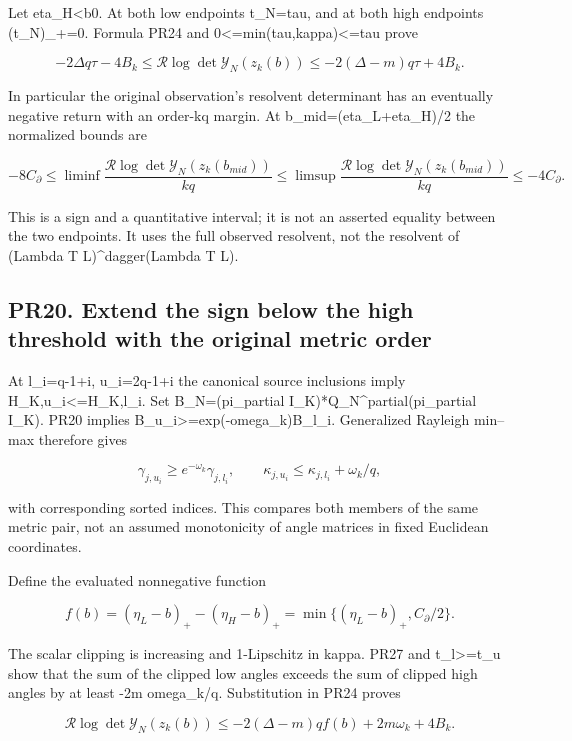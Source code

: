 \documentclass[11pt]{article}
\begin{document}
Let eta\_H\textless b0. At both low endpoints t\_N=tau, and at both high endpoints (t\_N)\_+=0. Formula PR24 and 0\textless=min(tau,kappa)\textless=tau prove

\[
\boxed{
-2\Delta q\tau-4B_k
\le\mathcal R\log\det\mathscr Y_N(z_k(b))
\le-2(\Delta-m)q\tau+4B_k.
}
\tag{PR25}
\]

In particular the original observation's resolvent determinant has an eventually negative return with an order-kq margin. At b\_mid=(eta\_L+eta\_H)/2 the normalized bounds are

\[
-8C_\partial\le
\liminf\frac{\mathcal R\log\det\mathscr Y_N(z_k(b_{mid}))}{kq}
\le\limsup\frac{\mathcal R\log\det\mathscr Y_N(z_k(b_{mid}))}{kq}
\le-4C_\partial.
\tag{PR26}
\]

This is a sign and a quantitative interval; it is not an asserted equality between the two endpoints. It uses the full observed resolvent, not the resolvent of (Lambda T L)\^{}dagger(Lambda T L).

\subsection{PR20. Extend the sign below the high threshold with the original metric order}\label{pr20.-extend-the-sign-below-the-high-threshold-with-the-original-metric-order}

At l\_i=q-1+i, u\_i=2q-1+i the canonical source inclusions imply H\_K,u\_i\textless=H\_K,l\_i. Set B\_N=(pi\_partial I\_K)*Q\_N\^{}partial(pi\_partial I\_K). PR20 implies B\_u\_i\textgreater=exp(-omega\_k)B\_l\_i. Generalized Rayleigh min--max therefore gives

\[
\gamma_{j,u_i}\ge e^{-\omega_k}\gamma_{j,l_i},\qquad
\kappa_{j,u_i}\le\kappa_{j,l_i}+\omega_k/q,
\tag{PR27}
\]

with corresponding sorted indices. This compares both members of the same metric pair, not an assumed monotonicity of angle matrices in fixed Euclidean coordinates.

Define the evaluated nonnegative function

\[
f(b)=(\eta_L-b)_+-(\eta_H-b)_+
=\min\{(\eta_L-b)_+,C_\partial/2\}.
\]

The scalar clipping is increasing and 1-Lipschitz in kappa. PR27 and t\_l\textgreater=t\_u show that the sum of the clipped low angles exceeds the sum of clipped high angles by at least -2m omega\_k/q. Substitution in PR24 proves

\[
\boxed{
\mathcal R\log\det\mathscr Y_N(z_k(b))
\le-2(\Delta-m)q f(b)+2m\omega_k+4B_k.
}
\tag{PR28}
\]
\end{document}
